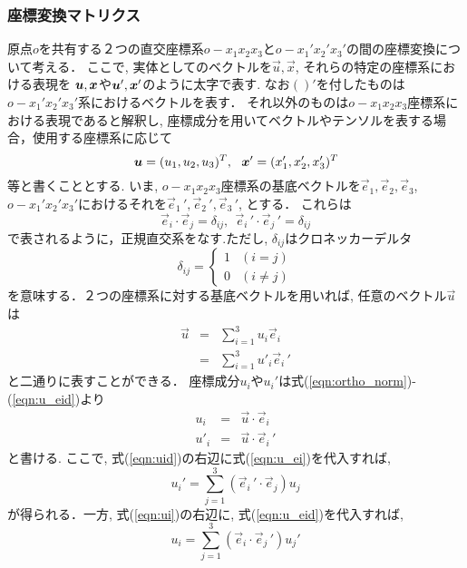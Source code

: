 \documentclass[10pt,a4j]{jbook}
\begin{document}
\subsubsection{座標変換マトリクス}
原点$o$を共有する２つの直交座標系$o-x_1x_2x_3$と$o-x_1'x_2'x_3'$の間の座標変換について考える．
ここで, 実体としてのベクトルを$\vec{u},\vec{x}$, それらの特定の座標系における表現を
$\mbox{\boldmath $u$},\mbox{\boldmath $x$}$や$\mbox{\boldmath $u$}',\mbox{\boldmath $x$}'$のように太字で表す. 
なお$()'$を付したものは$o-x_1'x_2'x_3'$系におけるベクトルを表す．
それ以外のものは$o-x_1x_2x_3$座標系における表現であると解釈し, 
座標成分を用いてベクトルやテンソルを表する場合，使用する座標系に応じて
\[
	\fat{u}=(u_1, u_2, u_3)^T, \ \ \fat{x}'=(x_1', x_2', x_3')^T
\]
等と書くこととする.
いま, $o-x_1x_2x_3$座標系の基底ベクトルを$\vec{e}_1, \vec{e}_2, \vec{e}_3$, 
$o-x_1'x_2'x_3'$におけるそれを$\vec{e}_1\,', \vec{e}_2\,', \vec{e}_3 \,'$, 
とする． これらは
\begin{equation}
	\vec{e}_i\cdot \vec{e}_j=\delta_{ij}, \ \ 
	\vec{e}_i\,' \cdot \vec{e}_j\,'=\delta_{ij}
	\label{eqn:ortho_norm}
\end{equation}
で表されるように，正規直交系をなす.ただし, $\delta_{ij}$はクロネッカーデルタ
\begin{equation}
	\delta _{ij}=\left\{
	\begin{array}{cc}
		1 & (i=j) \\
		0 & (i\neq j)
	\end{array}
	\right.
	\label{eqn:dij}
\end{equation}
を意味する．２つの座標系に対する基底ベクトルを用いれば, 任意のベクトル$\vec{u}$は
\begin{eqnarray}
	\vec{u} &=& \sum_{i=1}^3 u_i\vec{e}_i 
	\label{eqn:u_ei}
	\\
	&=& \sum_{i=1}^3 u'_i\vec{e}_i\,' 
	\label{eqn:u_eid}
\end{eqnarray}
と二通りに表すことができる． 座標成分$u_i$や$u_i'$は式(\ref{eqn:ortho_norm})-(\ref{eqn:u_eid})より
\begin{eqnarray}
	u_i &=& \vec{u}\cdot \vec{e}_i \label{eqn:ui}\\
	u'_i&=& \vec{u}\cdot \vec{e}_i\,' \label{eqn:uid}
\end{eqnarray}
と書ける. ここで, 式(\ref{eqn:uid})の右辺に式(\ref{eqn:u_ei})を代入すれば, 
\begin{equation}
	u_i'=\sum_{j=1}^3 (\vec{e}_i\,'\cdot \vec{e}_j) u_j 
\end{equation}
が得られる．一方, 式(\ref{eqn:ui})の右辺に, 式(\ref{eqn:u_eid})を代入すれば, 
\begin{equation}
	u_i=\sum_{j=1}^3 (\vec{e}_i\cdot \vec{e}_j\, ') u_j' 
\end{equation}
\end{document}
